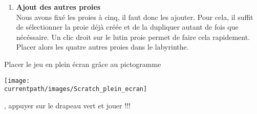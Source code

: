 \begin{changemargin}{-10mm}{-10mm}
\begin{enigme}
\begin{enumerate}
         \item {\bf Ajout des autres proies} \dotfill \\
          Nous avons fixé les proies à cinq, il faut donc les ajouter. Pour cela, il suffit de sélectionner la proie déjà créée et de la \textcolor{B1}{dupliquer} autant de fois que nécéssaire. Un clic droit sur le lutin proie permet de faire cela rapidement. \\
          Placer alors les quatre autres proies dans le labyrinthe.
      \end{enumerate}   
  
   \partie[let's go !]
      Placer le jeu en plein écran grâce au pictogramme \parbox{1cm}{\texttt{[image: \\currentpath/images/Scratch\_plein\_ecran]}}, appuyer sur le {\textcolor{B1}{drapeau vert}} et jouer !!!
\end{enigme}
\end{changemargin}